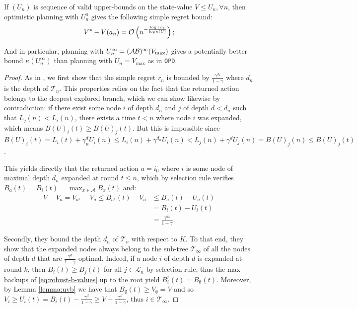 \documentclass{article}
\begin{document}
\begin{theorem}
If $(U_n)$ is sequence of valid upper-bounds on the state-value $V\leq U_n, \forall n$, then optimistic planning with $U_n^a$ gives the following simple regret bound: %
\begin{align*}
V^* - V({a_n}) = \mathcal{O}\left(n^{-\frac{\log 1/\gamma}{\log \kappa(U)}}\right);
\end{align*}
\end{theorem}

And in particular, planning with $U_n^\infty=(\mathcal{A}\mathcal{B})^\infty(V_{\max})$ gives a potentially better bound $\kappa(U_n^\infty)$ than planning with $U_n=V_{\max}$ as in \texttt{OPD}.

\begin{proof}
	
	
	As in \citep[][Theorem 2]{Hren2008}, we first show that the simple regret $r_n$ is bounded by $\frac{\gamma^{d_n}}{1 - \gamma}$ where $d_n$ is the depth of $\mathcal{T}_n$. This properties relies on the fact that the returned action belongs to the deepest explored branch, which we can show likewise by contradiction: if there exist some node $i$ of depth $d_n$ and $j$ of depth $d<d_n$ such that $L_j(n) < L_i(n)$, there exists a time $t<n$ where node $i$ was expanded, which means $B(U)_i(t) \geq B(U)_j(t)$. But this is impossible since $B(U)_i(t) = L_i(t) + \gamma^d_n U_i(n) \leq L_i(n) + \gamma^{d_n} U_i(n) < L_j(n) + \gamma^d U_j(n) = B(U)_j(n) \leq B(U)_j(t)$.
	
	This yields directly that the returned action $a = i_0$ where $i$ is some node of maximal depth $d_n$ expanded at round $t\leq n$, which by selection rule verifies $B_a(t) = B_i(t) = \max_{x\in\mathcal{A}} B_x(t)$ and:
	\begin{align*}
	\label{eq:Rndn}
	V - V_a = V_{a^{\star}} - V_a  \leq B_{a^{\star}}(t) - V_a &\leq B_{a}(t) - U_a(t) \\
	&= B_{i}(t) - U_i(t) \\
	&= \frac{\gamma^{d_n}}{1-\gamma}.
	\end{align*}
	
	Secondly, they bound the depth $d_n$ of $\mathcal{T}_n$ with respect to $K$. To that end, they show that the expanded nodes always belong to the sub-tree $\mathcal{T}_\infty$ of all the nodes of depth $d$ that are $\frac{\gamma^d}{1-\gamma}$-optimal. Indeed, if a node $i$ of depth $d$ is expanded at round $k$, then $B_i(t) \geq B_j(t)$ for all $j\in \mathcal{L}_n$ by selection rule, thus the max-backups of \eqref{eq:robust-b-values} up to the root yield $B^r_i(t) = B_\emptyset(t)$. Moreover, by Lemma \ref{lemma:uvb} we have that $B_\emptyset(t) \geq V_\emptyset = V$ and so $V_i \geq U_i(t) = B_i(t) - \frac{\gamma^d}{1-\gamma} \geq V - \frac{\gamma^d}{1-\gamma}$, thus $i \in \mathcal{T}_\infty$.
	

\end{proof}
\end{document}
